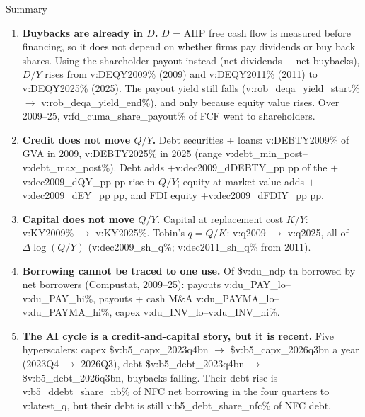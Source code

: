 \documentclass[aspectratio=169,10pt,t]{beamer}
\newcommand{\val}[1]{\csname v:#1\endcsname}
\begin{document}
\begin{frame}{Summary}
\vspace{0cm}
\begin{enumerate}\setlength{\itemsep}{0.1cm}
\item \textbf{Buybacks are already in $D$.} $D$ = AHP free cash flow is measured before financing, so it does not depend on whether firms pay dividends or buy back shares. Using the shareholder payout instead (net dividends + net buybacks), $D/Y$ rises from \val{DEQY2009}\% (2009) and \val{DEQY2011}\% (2011) to \val{DEQY2025}\% (2025). The payout yield still falls (\val{rob_deqa_yield_start}\% $\to$ \val{rob_deqa_yield_end}\%), and only because equity value rises. Over 2009--25, \val{fd_cuma_share_payout}\% of FCF went to shareholders.
\item \textbf{Credit does not move $Q/Y$.} Debt securities + loans: \val{DEBTY2009}\% of GVA in 2009, \val{DEBTY2025}\% in 2025 (range \val{debt_min_post}--\val{debt_max_post}\%). Debt adds $+$\val{dec2009_dDEBTY_pp} pp of the $+$\val{dec2009_dQY_pp} pp rise in $Q/Y$; equity at market value adds $+$\val{dec2009_dEY_pp} pp, and FDI equity $+$\val{dec2009_dFDIY_pp} pp.
\item \textbf{Capital does not move $Q/Y$.} Capital at replacement cost $K/Y$: \val{KY2009}\% $\to$ \val{KY2025}\%. Tobin's $q=Q/K$: \val{q2009} $\to$ \val{q2025}, all of $\Delta\log(Q/Y)$ (\val{dec2009_sh_q}\%; \val{dec2011_sh_q}\% from 2011).
\item \textbf{Borrowing cannot be traced to one use.} Of \$\val{du_ndp} tn borrowed by net borrowers (Compustat, 2009--25): payouts \val{du_PAY_lo}--\val{du_PAY_hi}\%, payouts + cash M\&A \val{du_PAYMA_lo}--\val{du_PAYMA_hi}\%, capex \val{du_INV_lo}--\val{du_INV_hi}\%.
\item \textbf{The AI cycle is a credit-and-capital story, but it is recent.} Five hyperscalers: capex \$\val{b5_capx_2023q4}bn $\to$ \$\val{b5_capx_2026q3}bn a year (2023Q4 $\to$ 2026Q3), debt \$\val{b5_debt_2023q4}bn $\to$ \$\val{b5_debt_2026q3}bn, buybacks falling. Their debt rise is \val{b5_ddebt_share_nb}\% of NFC net borrowing in the four quarters to \val{latest_q}, but their debt is still \val{b5_debt_share_nfc}\% of NFC debt.
\end{enumerate}
\end{frame}
\end{document}
